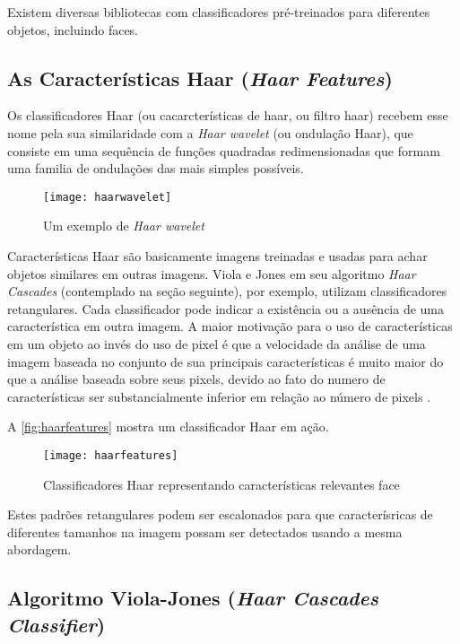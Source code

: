 Existem diversas bibliotecas com classificadores pré-treinados para diferentes objetos, incluindo faces.


\subsection{As Características Haar (\textit{Haar Features}) }\label{subsubsec:elem_haar}

Os classificadores Haar (ou cacarcterísticas de haar, ou filtro haar) recebem esse nome pela sua similaridade com a \textit{Haar wavelet} (ou ondulação Haar), que consiste em uma sequência de funções quadradas redimensionadas que formam uma familia de ondulações das mais simples possíveis.

 \begin{figure}[h]
 	\centering
 	\texttt{[image: haarwavelet]}
 	\caption{Um exemplo de \textit{Haar wavelet}}
 	\label{fig:haarwavelet}
 \end{figure}

Características Haar são basicamente imagens treinadas e usadas para achar objetos similares em outras imagens. Viola e Jones em seu algoritmo \textit{Haar Cascades} (contemplado na seção seguinte), por exemplo, utilizam classificadores retangulares. Cada classificador pode indicar a existência ou a ausência de uma característica em outra imagem. A maior motivação para o uso de características em um objeto ao invés do uso de pixel é que a velocidade da análise de uma imagem baseada no conjunto de sua principais características é muito maior do que a análise baseada sobre seus pixels, devido ao fato do numero de características ser substancialmente inferior em relação ao número de pixels \cite{gustavo_cascata}.

A \autoref{fig:haarfeatures} mostra um classificador Haar em ação.

 \begin{figure}[h]
	\centering
	\texttt{[image: haarfeatures]}
	\caption{Classificadores Haar representando características relevantes face}
	\label{fig:haarfeatures}
\end{figure}

Estes padrões retangulares podem ser escalonados para que caracterísricas de diferentes tamanhos na imagem possam ser detectados usando a mesma abordagem.


\subsection{Algoritmo Viola-Jones (\textit{Haar Cascades Classifier}) }\label{subsubsec:violajones}

